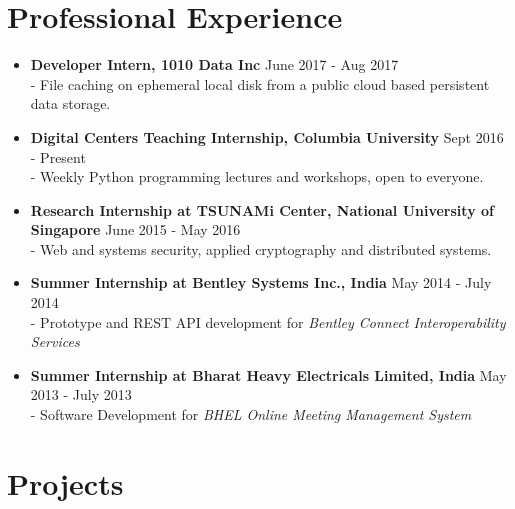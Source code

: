 \documentclass{article}
\begin{document}
\section*{Professional Experience}
\begin{itemize}
    \item \textbf{Developer Intern, 1010 Data Inc} {\hfill June 2017 - Aug 2017}\\
    - File caching on ephemeral local disk from a public cloud based persistent data storage.

    \item \textbf{Digital Centers Teaching Internship, Columbia University} {\hfill Sept 2016 - Present}\\
    - Weekly Python programming lectures and workshops, open to everyone.

    \item \textbf{Research Internship at TSUNAMi Center, National University of Singapore} {\hfill June 2015 - May 2016}\\
    - Web and systems security, applied cryptography and distributed systems.
    
    \item \textbf{Summer Internship at Bentley Systems Inc., India} {\hfill May 2014 - July 2014}\\
    - Prototype and REST API development for \textit{Bentley Connect Interoperability Services}

    \item \textbf{Summer Internship at Bharat Heavy Electricals Limited, India} {\hfill May 2013 - July 2013}\\
    - Software Development for \textit{BHEL Online Meeting Management System}
\end{itemize}

\section*{Projects}
\end{document}
